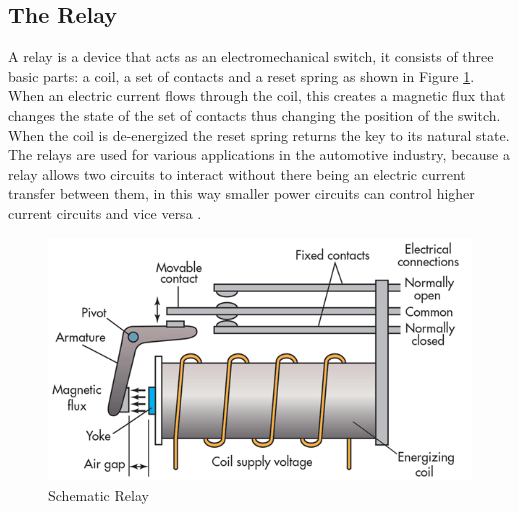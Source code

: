 \subsection{The Relay}
	A relay is a device that acts as an electromechanical switch, it consists of three basic parts: a coil, a set of contacts and a reset spring as shown in Figure \ref{fig-relay}. When an electric current flows through the coil, this creates a magnetic flux that changes the state of the set of contacts thus changing the position of the switch. When the coil is de-energized the reset spring returns the key to its natural state. The relays are used for various applications in the automotive industry, because a relay allows two circuits to interact without there being an electric current transfer between them, in this way smaller power circuits can control higher current circuits and vice versa \cite{keller1962relays} .

	\begin{figure}[htbp]
		\centering
			\includegraphics[scale=0.45]{figuras/fig-relay.png}
			\caption{Schematic Relay \cite{relay-scheme}}
		\label{fig-relay}
	\end{figure}
